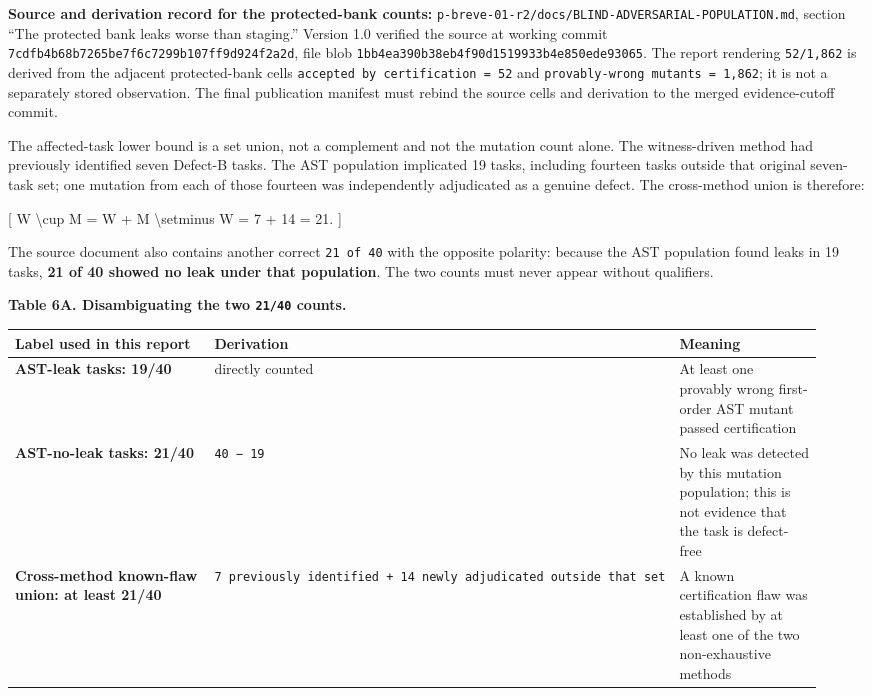 \documentclass[
  9pt,
  letterpaper,
]{article}
\begin{document}
\textbf{Source and derivation record for the protected-bank counts:}
\texttt{p-breve-01-r2/docs/BLIND-ADVERSARIAL-POPULATION.md}, section
``The protected bank leaks worse than staging.'' Version 1.0 verified
the source at working commit
\texttt{7cdfb4b68b7265be7f6c7299b107ff9d924f2a2d}, file blob
\texttt{1bb4ea390b38eb4f90d1519933b4e850ede93065}. The report rendering
\texttt{52/1,862} is derived from the adjacent protected-bank cells
\texttt{accepted\ by\ certification\ =\ 52} and
\texttt{provably-wrong\ mutants\ =\ 1,862}; it is not a separately
stored observation. The final publication manifest must rebind the
source cells and derivation to the merged evidence-cutoff commit.

The affected-task lower bound is a set union, not a complement and not
the mutation count alone. The witness-driven method had previously
identified seven Defect-B tasks. The AST population implicated 19 tasks,
including fourteen tasks outside that original seven-task set; one
mutation from each of those fourteen was independently adjudicated as a
genuine defect. The cross-method union is therefore:

{[} \textbar W \textbackslash cup M\textbar{} = \textbar W\textbar{} +
\textbar M \textbackslash setminus W\textbar{} = 7 + 14 = 21. {]}

The source document also contains another correct \texttt{21\ of\ 40}
with the opposite polarity: because the AST population found leaks in 19
tasks, \textbf{21 of 40 showed no leak under that population}. The two
counts must never appear without qualifiers.

\textbf{Table 6A. Disambiguating the two \texttt{21/40} counts.}

\begin{longtable}[]{@{}p{0.48\linewidth}p{0.18\linewidth}p{0.28\linewidth}@{}}
\toprule\noalign{}
Label used in this report & Derivation & Meaning \\
\midrule\noalign{}
\endhead
\bottomrule\noalign{}
\endlastfoot
\textbf{AST-leak tasks: 19/40} & directly counted & At least one
provably wrong first-order AST mutant passed certification \\
\textbf{AST-no-leak tasks: 21/40} & \texttt{40\ −\ 19} & No leak was
detected by this mutation population; this is not evidence that the task
is defect-free \\
\textbf{Cross-method known-flaw union: at least 21/40} &
\texttt{7\ previously\ identified\ +\ 14\ newly\ adjudicated\ outside\ that\ set}
& A known certification flaw was established by at least one of the two
non-exhaustive methods \\
\end{longtable}
\end{document}
